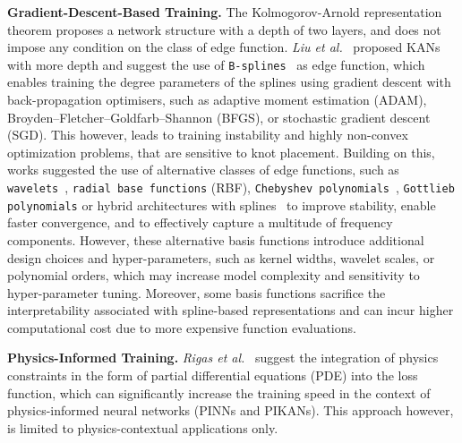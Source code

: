 \documentclass{article}
\begin{document}
\textbf{Gradient-Descent-Based Training.}
The Kolmogorov-Arnold representation theorem proposes a network structure with a depth of two layers, and does not impose any condition on the class of edge function.
\textit{Liu et al.}~\cite{liu2024kan} proposed KANs with more depth and suggest the use of \texttt{B-splines}~\cite{fakhoury2022exsplinet} as edge function, which enables training the degree parameters of the splines using gradient descent with back-propagation optimisers, such as adaptive moment estimation (ADAM), Broyden–Fletcher–Goldfarb–Shannon (BFGS), or stochastic gradient descent (SGD).
This however, leads to training instability and highly non-convex optimization problems, that are sensitive to knot placement.
Building on this, works suggested the use of alternative classes of edge functions, such as \texttt{wavelets}~\cite{bozorgasl2405wav}, \texttt{radial base functions} (RBF), \texttt{Chebyshev polynomials}~\cite{ss2024chebyshev}, \texttt{Gottlieb polynomials} or hybrid architectures with splines~\cite{ta2024bsrbf} to improve stability, enable faster convergence, and to effectively capture a multitude of frequency components.
However, these alternative basis functions introduce additional design choices and hyper-parameters, such as kernel widths, wavelet scales, or polynomial orders, which may increase model complexity and sensitivity to hyper-parameter tuning.
Moreover, some basis functions sacrifice the interpretability associated with spline-based representations and can incur higher computational cost due to more expensive function evaluations.

\textbf{Physics-Informed Training.}
\textit{Rigas et al.}~\cite{rigas2024adaptive} suggest the integration of physics constraints in the form of partial differential equations (PDE) into the loss function, which can significantly increase the training speed in the context of physics-informed neural networks (PINNs and PIKANs). 
This approach however, is limited to physics-contextual applications only.
\end{document}
